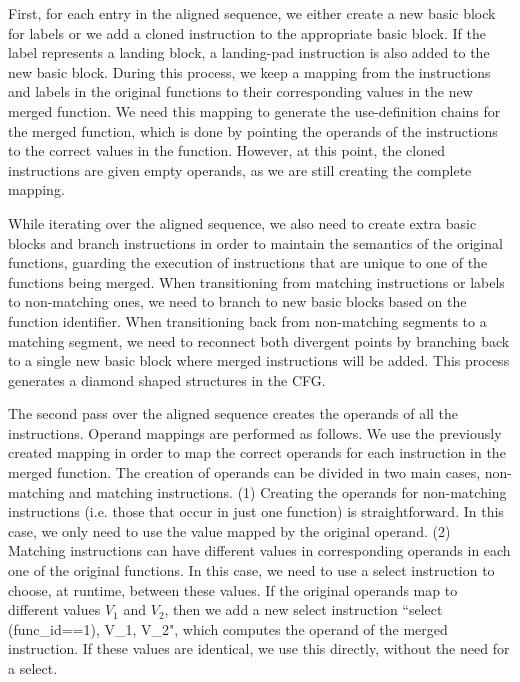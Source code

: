 First, for each entry in the aligned sequence, we either create a new basic
block for labels or we add a cloned instruction to the appropriate basic
block.
If the label represents a landing block, a landing-pad instruction is also added
to the new basic block.
During this process, we keep a mapping from the instructions and labels in the
original functions to their corresponding values in the new merged function.
We need this mapping to generate the use-definition chains for the merged function, which is done by pointing the operands of the
instructions to the correct values in the function.
However, at this point, the cloned instructions are given empty operands,
as we are still creating the complete mapping.

While iterating over the aligned sequence, we also need to create extra basic
blocks and branch instructions in order to maintain the semantics of the
original functions, guarding the execution of instructions that are unique to
one of the functions being merged.
When transitioning from matching instructions or labels to non-matching ones,
we need to branch to new basic blocks based on the function identifier.
When transitioning back from non-matching segments to a matching segment, we need
to reconnect both divergent points by branching back to a single new basic block
where merged instructions will be added.
This process generates a diamond shaped structures in the CFG. %



The second pass over the aligned sequence creates the operands of all the instructions.
Operand mappings are performed as follows.
We use the previously created mapping in order to map the correct operands for each instruction in the merged function. The creation of operands can be divided in two main cases, non-matching and matching instructions. (1) Creating the operands for non-matching instructions (i.e. those that occur in just one function) is straightforward. In this case, we only need to use the value mapped by the original operand. (2) Matching instructions can have different values in corresponding operands in each one of the original functions. In this case, we need to use a select instruction to choose, at runtime, between these values. If the original operands map to different values $V_1$ and $V_2$, then we add a new select instruction ``select (func\_id==1), V\_1, V\_2", which computes the operand of the merged instruction. If these values are identical, we use this directly, without the need for a select.

